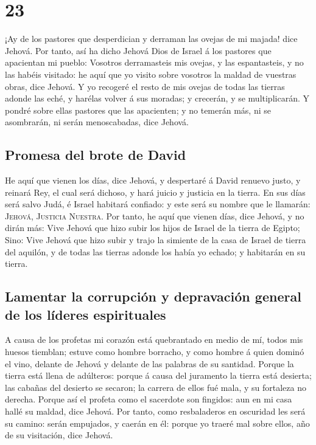 \hypertarget{section-22}{%
\section{23}\label{section-22}}

 ¡Ay de los pastores que desperdician y derraman las
ovejas de mi majada! dice Jehová.  Por tanto, así ha dicho
Jehová Dios de Israel á los pastores que apacientan mi pueblo: Vosotros
derramasteis mis ovejas, y las espantasteis, y no las habéis visitado:
he aquí que yo visito sobre vosotros la maldad de vuestras obras, dice
Jehová.  Y yo recogeré el resto de mis ovejas de todas las
tierras adonde las eché, y harélas volver á sus moradas; y crecerán, y
se multiplicarán.  Y pondré sobre ellas pastores que las
apacienten; y no temerán más, ni se asombrarán, ni serán menoscabadas,
dice Jehová.

\hypertarget{promesa-del-brote-de-david}{%
\subsection{Promesa del brote de
David}\label{promesa-del-brote-de-david}}

 He aquí que vienen los días, dice Jehová, y despertaré á
David renuevo justo, y reinará Rey, el cual será dichoso, y hará juicio
y justicia en la tierra.  En sus días será salvo Judá, é
Israel habitará confiado: y este será su nombre que le llamarán:
\textsc{Jehová}, \textsc{Justicia} \textsc{Nuestra}.  Por
tanto, he aquí que vienen días, dice Jehová, y no dirán más: Vive Jehová
que hizo subir los hijos de Israel de la tierra de Egipto;
 Sino: Vive Jehová que hizo subir y trajo la simiente de
la casa de Israel de tierra del aquilón, y de todas las tierras adonde
los había yo echado; y habitarán en su tierra.

\hypertarget{lamentar-la-corrupciuxf3n-y-depravaciuxf3n-general-de-los-luxedderes-espirituales}{%
\subsection{Lamentar la corrupción y depravación general de los líderes
espirituales}\label{lamentar-la-corrupciuxf3n-y-depravaciuxf3n-general-de-los-luxedderes-espirituales}}

 A causa de los profetas mi corazón está quebrantado en
medio de mí, todos mis huesos tiemblan; estuve como hombre borracho, y
como hombre á quien dominó el vino, delante de Jehová y delante de las
palabras de su santidad.  Porque la tierra está llena de
adúlteros: porque á causa del juramento la tierra está desierta; las
cabañas del desierto se secaron; la carrera de ellos fué mala, y su
fortaleza no derecha.  Porque así el profeta como el
sacerdote son fingidos: aun en mi casa hallé su maldad, dice Jehová.
 Por tanto, como resbaladeros en oscuridad les será su
camino: serán empujados, y caerán en él: porque yo traeré mal sobre
ellos, año de su visitación, dice Jehová.

